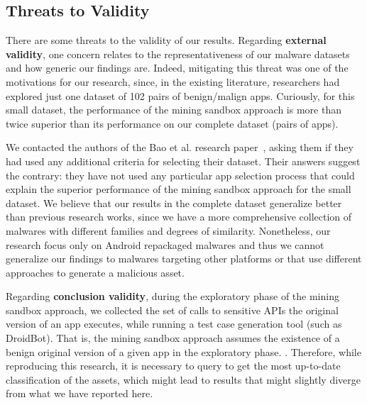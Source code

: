 \subsection{Threats to Validity}\label{sec:threats}


There are some threats to the validity of our results.
Regarding {\bf external validity}, one concern relates to the 
representativeness of our malware datasets and how generic our findings are.
Indeed, mitigating this threat was one of the motivations for our research,
since, in the existing literature, researchers had explored just
one dataset of 102 pairs of benign/malign apps. Curiously,
for this small dataset, the performance of the
mining sandbox approach is more than twice superior
than its performance on our complete dataset (\apps pairs of
apps).

We contacted the authors of the Bao et al. research paper~\cite{DBLP:conf/wcre/BaoLL18}, asking them
if they had used any additional criteria for selecting their
dataset. Their answers suggest the contrary: they have not used
any particular app selection process that
could explain the superior performance of the mining
sandbox approach for the small dataset. We believe that
our results in the complete dataset generalize better than previous research works,
since we have a more comprehensive collection of malwares with different
families and degrees of similarity. Nonetheless, our
research focus only on Android repackaged malwares and thus we
cannot generalize our findings to malwares targeting
other platforms or that use different approaches to
generate a malicious asset.

Regarding {\bf conclusion validity}, during the exploratory phase of the mining sandbox approach,
we collected the set of calls to sensitive APIs the original version of
an app executes, while running a test case generation tool (such as
DroidBot). That is, the mining sandbox approach assumes the existence of a benign original
version of a given app in the exploratory phase. .
Therefore, while reproducing this research, it is necessary to query \vt to get the most
up-to-date classification of the assets, which might lead to results that might slightly
diverge from what we have reported here.

